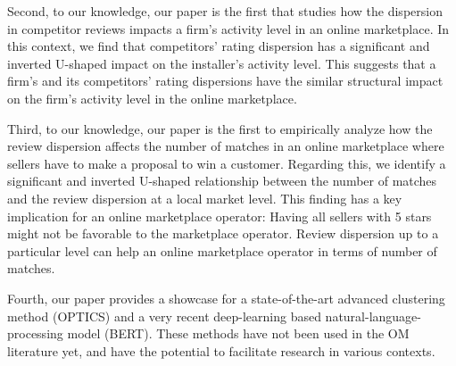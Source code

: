 \documentclass[mnsc,blindrev]{informs3}
\begin{document}
	
Second, to our knowledge, our paper is the first that studies how the dispersion in competitor reviews impacts a firm's activity level in an online marketplace. In this context, we find that competitors' rating dispersion has a significant and inverted U-shaped impact on the installer's activity level. This suggests that a firm's and its competitors' rating dispersions have the similar structural impact on the firm's activity level in the online marketplace.

Third, to our knowledge, our paper is the first to empirically analyze how the review dispersion affects the number of matches in an online marketplace where sellers have to make a proposal to win a customer. Regarding this, we identify a significant and inverted U-shaped relationship between the number of matches and the review dispersion at a local market level. This finding has a key implication for an online marketplace operator: Having all sellers with 5 stars might not be favorable to the marketplace operator. Review dispersion up to a particular level can help an online marketplace operator in terms of number of matches.

Fourth, our paper provides a showcase for a state-of-the-art advanced clustering method (OPTICS) and a very recent deep-learning based natural-language-processing model (BERT). These methods have not been used in the OM literature yet, and have the potential to facilitate research in various contexts.

	
	
	
\end{document}
